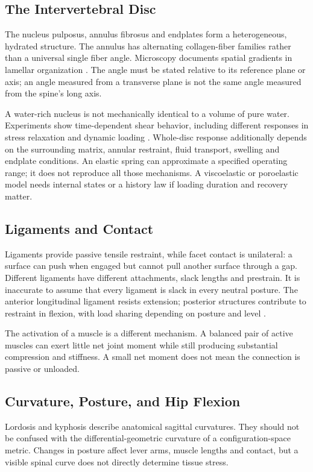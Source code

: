 \subsection{The Intervertebral Disc}
The nucleus pulposus, annulus fibrosus and endplates form a heterogeneous, hydrated structure. The annulus has alternating collagen-fiber families rather than a universal single fiber angle. Microscopy documents spatial gradients in lamellar organization \citep{Cassidy1989DiscStructure}. The angle must be stated relative to its reference plane or axis; an angle measured from a transverse plane is not the same angle measured from the spine's long axis.

A water-rich nucleus is not mechanically identical to a volume of pure water. Experiments show time-dependent shear behavior, including different responses in stress relaxation and dynamic loading \citep{Iatridis1997NucleusShear}. Whole-disc response additionally depends on the surrounding matrix, annular restraint, fluid transport, swelling and endplate conditions. An elastic spring can approximate a specified operating range; it does not reproduce all those mechanisms. A viscoelastic or poroelastic model needs internal states or a history law if loading duration and recovery matter.

\subsection{Ligaments and Contact}
Ligaments provide passive tensile restraint, while facet contact is unilateral: a surface can push when engaged but cannot pull another surface through a gap. Different ligaments have different attachments, slack lengths and prestrain. It is inaccurate to assume that every ligament is slack in every neutral posture. The anterior longitudinal ligament resists extension; posterior structures contribute to restraint in flexion, with load sharing depending on posture and level \citep{OpenStax2022VertebralColumn}.

The activation of a muscle is a different mechanism. A balanced pair of active muscles can exert little net joint moment while still producing substantial compression and stiffness. A small net moment does not mean the connection is passive or unloaded.

\subsection{Curvature, Posture, and Hip Flexion}
Lordosis and kyphosis describe anatomical sagittal curvatures. They should not be confused with the differential-geometric curvature of a configuration-space metric. Changes in posture affect lever arms, muscle lengths and contact, but a visible spinal curve does not directly determine tissue stress.

